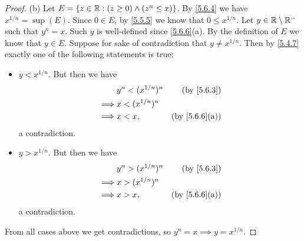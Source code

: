 \begin{proof}{(b)}
  Let \(E = \{z \in \mathbb{R} : (z \geq 0) \land (z^n \leq x)\}\).
  By \cref{5.6.4} we have \(x^{1 / n} = \sup(E)\).
  Since \(0 \in E\), by \cref{5.5.5} we know that \(0 \leq x^{1 / n}\).
  Let \(y \in \mathbb{R} \setminus \mathbb{R}^-\) such that \(y^n = x\).
  Such \(y\) is well-defined since \cref{5.6.6}(a).
  By the definition of \(E\) we know that \(y \in E\).
  Suppose for sake of contradiction that \(y \neq x^{1 / n}\).
  Then by \cref{5.4.7} exactly one of the following statements is true:
  \begin{itemize}
    \item \(y < x^{1 / n}\).
          But then we have
          \begin{align*}
                     & y^n < (x^{1 / n})^n & \text{(by \cref{5.6.3})}    \\
            \implies & x < (x^{1 / n})^n                                 \\
            \implies & x < x,              & \text{(by \cref{5.6.6}(a))}
          \end{align*}
          a contradiction.
    \item \(y > x^{1 / n}\).
          But then we have
          \begin{align*}
                     & y^n > (x^{1 / n})^n & \text{(by \cref{5.6.3})}    \\
            \implies & x > (x^{1 / n})^n                                 \\
            \implies & x > x,              & \text{(by \cref{5.6.6}(a))}
          \end{align*}
          a contradiction.
  \end{itemize}
  From all cases above we get contradictions, so \(y^n = x \implies y = x^{1 / n}\).
\end{proof}

